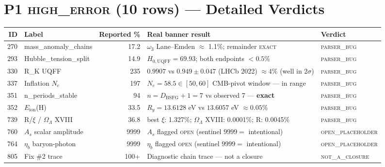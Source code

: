 \documentclass[11pt]{article}
\begin{document}
\section{P1 \textsc{high\_error} (10 rows) --- Detailed Verdicts}
\begin{longtable}{r l r p{6.5cm} l}
\toprule
\textbf{ID} & \textbf{Label} & \textbf{Reported \%} & \textbf{Real banner result} & \textbf{Verdict} \\
\midrule \endhead
270 & mass\_anomaly\_chains   & 17.2   & $\omega_3$ Lane--Emden $\approx$ 1.1\%; remainder \textsc{exact}        & \textsc{parser\_bug} \\
293 & Hubble\_tension\_split  & 14.9   & $H_{0,\mathrm{UQFF}}=69.93$; both endpoints $<0.5\%$                   & \textsc{parser\_bug} \\
330 & R\_K UQFF               & 235    & $0.9907$ vs $0.949 \pm 0.047$ (LHCb 2022) $\approx 4\%$ (well in $2\sigma$) & \textsc{parser\_bug} \\
337 & Inflation $N_e$         & 197    & $N_e = 58.5 \in [50,60]$ CMB-pivot window --- in range                 & \textsc{parser\_bug} \\
351 & n\_periods\_stable      & 94     & $n = D_{\mathrm{BSFG}}+1 = 7$ vs observed 7 --- \textbf{exact}         & \textsc{parser\_bug} \\
352 & $E_{\mathrm{ion}}$(H)   & 33.5   & $R_y = 13.6128$ eV vs $13.6057$ eV $\approx \mathbf{0.05\%}$           & \textsc{parser\_bug} \\
739 & R/$\xi$ / $\Omega_\Lambda$ XVIII & 36.8 & best $\xi$: 1.327\%; $\Omega_\Lambda$ XVIII: 0.0001\%; R: 0.0045\% & \textsc{parser\_bug} \\
760 & $A_s$ scalar amplitude  & 9999   & $A_s$ flagged \textsc{open} (sentinel $9999 =$ intentional)            & \textsc{open\_placeholder} \\
764 & $\eta_b$ baryon-photon  & 9999   & $\eta_b$ flagged \textsc{open} (sentinel $9999 =$ intentional)         & \textsc{open\_placeholder} \\
805 & Fix \#2 trace           & 100+   & Diagnostic chain trace --- not a closure                              & \textsc{not\_a\_closure} \\
\bottomrule
\end{longtable}
\end{document}
